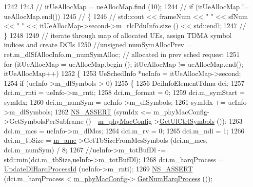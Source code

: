 \begin{DoxyCode}
1242 
1243 \textcolor{comment}{//      itUeAllocMap = ueAllocMap.find (10);}
1244 \textcolor{comment}{//      if (itUeAllocMap != ueAllocMap.end())}
1245 \textcolor{comment}{//      \{}
1246 \textcolor{comment}{//              std::cout << frameNum << " " << sfNum << " " << itUeAllocMap->second->m\_rlcPduInfo.size ()
       << std::endl;}
1247 \textcolor{comment}{//      \}}
1248 
1249         \textcolor{comment}{// iterate through map of allocated UEs, assign TDMA symbol indices and create DCIs}
1250         \textcolor{comment}{//unsigned numSymAllocPrev = ret.m\_dlSfAllocInfo.m\_numSymAlloc; // allocated in prev sched request}
1251         \textcolor{keywordflow}{for} (itUeAllocMap = ueAllocMap.begin (); itUeAllocMap != ueAllocMap.end(); itUeAllocMap++)
1252         \{
1253                 UeSchedInfo *ueInfo = itUeAllocMap->second;
1254                 \textcolor{keywordflow}{if} (ueInfo->m\_dlSymbols > 0)
1255                 \{
1256                         DciInfoElementTdma dci;
1257                         dci.m\_rnti = ueInfo->m\_rnti;
1258                         dci.m\_format = 0;
1259                         dci.m\_symStart = symIdx;
1260                         dci.m\_numSym = ueInfo->m\_dlSymbols;
1261                         symIdx += ueInfo->m\_dlSymbols;
1262                         \hyperlink{assert_8h_a6dccdb0de9b252f60088ce281c49d052}{NS\_ASSERT} (symIdx <= m\_phyMacConfig->GetSymbolsPerSubframe () - 
      \hyperlink{classns3_1_1MmWaveMacScheduler_a24d7af4971d2e500fe543cefbafa2fd9}{m\_phyMacConfig}->\hyperlink{classns3_1_1MmWavePhyMacCommon_aa0bf8af14050bc5dc6513fbc86319a9b}{GetUlCtrlSymbols} ());
1263                         dci.m\_mcs = ueInfo->m\_dlMcs;
1264                         dci.m\_rv = 0;
1265                         dci.m\_ndi = 1;
1266                         dci.m\_tbSize = \hyperlink{classns3_1_1MmWaveFlexTtiMaxRateMacScheduler_a8a84d69426586fddd45abe7174da607d}{m\_amc}->GetTbSizeFromMcsSymbols (dci.m\_mcs, dci.m\_numSym) / 8;
1267                         \textcolor{comment}{//ueInfo->m\_totBufDl -= std::min(dci.m\_tbSize,ueInfo->m\_totBufDl);}
1268                         dci.m\_harqProcess = \hyperlink{classns3_1_1MmWaveFlexTtiMaxRateMacScheduler_aa3f1e6c0ad6c35889567f13e3d90ab6c}{UpdateDlHarqProcessId} (ueInfo->m\_rnti);
1269                         \hyperlink{assert_8h_a6dccdb0de9b252f60088ce281c49d052}{NS\_ASSERT} (dci.m\_harqProcess < \hyperlink{classns3_1_1MmWaveMacScheduler_a24d7af4971d2e500fe543cefbafa2fd9}{m\_phyMacConfig}->
      \hyperlink{classns3_1_1MmWavePhyMacCommon_a40773d84172ebeb5aff125f56ebcc5ac}{GetNumHarqProcess} ());

\end{DoxyCode}
